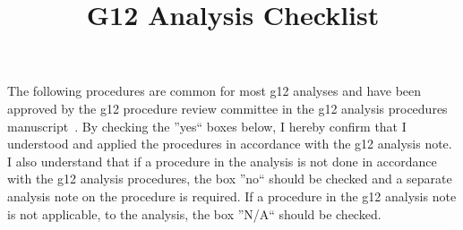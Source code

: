 \documentclass[11pt]{article} %
\title{G12 Analysis Checklist}
\date{\vspace{-10ex}}
\begin{document}
	\maketitle
		\thispagestyle{firststyle}
	The following procedures are common for most g12 analyses and have been approved by the g12 procedure review committee in the g12 analysis procedures manuscript~\cite{g12note}.
	By checking the ''yes`` boxes below, I hereby confirm that I understood and applied the procedures in accordance with the g12 analysis note. I also understand that if a procedure in the analysis is not done in accordance with the g12 analysis procedures, the box ''no`` should be checked and a separate analysis note on the procedure is required. If a procedure in the g12 analysis note is not applicable, to the analysis, the box ''N/A`` should be checked. 
	
\end{document}
